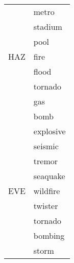 \begin{center}
\begin{longtable}{rl}
                        & metro                                                                                    \\
                        & stadium                                                                                  \\
                        & pool                                                                                     \\
        HAZ             & fire                                                                                     \\
                        & flood                                                                                    \\
                        & tornado                                                                                  \\
                        & gas                                                                                      \\
                        & bomb                                                                                     \\
                        & explosive                                                                                \\
                        & seismic                                                                                  \\
                        & tremor                                                                                   \\
                        & seaquake                                                                                 \\
        EVE             & wildfire                                                                                 \\
                        & twister                                                                                  \\
                        & tornado                                                                                  \\
                        & bombing                                                                                  \\
                        & storm                                                                                    \\

\end{longtable}
\end{center}
